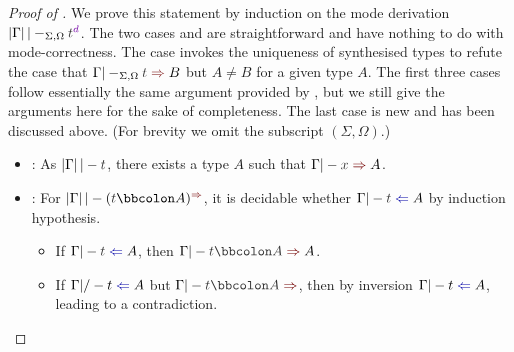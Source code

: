 \begin{proof}[Proof of {}]
  We prove this statement by induction on the mode derivation\/ $\erase{\Gamma} |-_{\Sigma, \Omega} \isTerm{t}^{\dir{d}}$.
  The two cases  and  are straightforward and have nothing to do with mode-correctness.
  The case  invokes the uniqueness of synthesised types to refute the case that $\Gamma |-_{\Sigma, \Omega} \isTerm{t} \syn B$ but $A \neq B$ for a given type $A$.
  The first three cases follow essentially the same argument provided by \citet{Wadler2022}, but we still give the arguments here for the sake of completeness.
  The last case  is new and has been discussed above.
  (For brevity we omit the subscript $(\Sigma, \Omega)$.)
  \begin{itemize}
    \item {}: As $\erase{\Gamma} |- \isTerm{t}$, there exists a type $A$ such that $\Gamma |- \isTerm{x} \syn A$.

    \item {}: For $\erase{\Gamma} |- (\isTerm{t} \annotate A)^{\syn}$, it is decidable whether $\Gamma |- \isTerm{t} \chk A$ by induction hypothesis.
      \begin{itemize}
        \item If $\Gamma |- \isTerm{t} \chk A$, then $\Gamma |- \isTerm{t \annotate A} \syn A$.
        \item If $\Gamma |/- t \chk A$ but $\Gamma |- \isTerm{t \annotate A} \syn$, then by inversion $\Gamma |- t \chk A$, leading to a contradiction.
      \end{itemize}
      

\end{itemize}
\end{proof}
